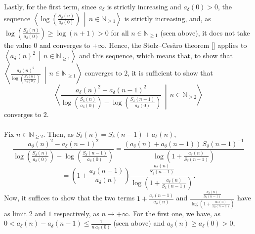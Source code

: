 \begin{solution}
    Lastly, for the first term, since \( a_\delta \) is strictly increasing and \( a_\delta\left(0\right) > 0 \), the sequence \( \left\langle \log\left(\frac{S_\delta\left(n\right)}{a_\delta\left(0\right)}\right) \,\middle|\, n \in \mathbb{N}_{\geq 1} \right\rangle \) is strictly increasing, and, as \( \log\left(\frac{S_\delta\left(n\right)}{a_\delta\left(0\right)}\right) \geq \log\left(n+1\right) > 0 \) for all \( n \in \mathbb{N}_{\geq 1} \) (seen above), it does not take the value \( 0 \) and converges to \( +\infty \). Hence, the Stolz–Ces\`aro theorem [] applies to \( \left\langle a_\delta\left(n\right)^2 \,\middle|\, n \in \mathbb{N}_{\geq 1} \right\rangle \) and this sequence, which means that, to show that \( \left\langle \frac{a_\delta\left(n\right)^2}{\log\left(\frac{S_\delta\left(n\right)}{a_\delta\left(0\right)}\right)} \,\middle|\, n \in \mathbb{N}_{\geq 1} \right\rangle \) converges to \( 2 \), it is sufficient to show that
    \[
        \left\langle \frac{a_\delta\left(n\right)^2-a_\delta\left(n-1\right)^2}{\log\left(\frac{S_\delta\left(n\right)}{a_\delta\left(0\right)}\right)-\log\left(\frac{S_\delta\left(n-1\right)}{a_\delta\left(0\right)}\right)} \,\middle|\, n \in \mathbb{N}_{\geq 2} \right\rangle
    \]
    converges to \( 2 \).
    \\\\
    Fix \( n \in \mathbb{N}_{\geq 2} \). Then, as \( S_\delta\left(n\right) = S_\delta\left(n-1\right)+a_\delta\left(n\right) \),
    \[
        \frac{a_\delta\left(n\right)^2-a_\delta\left(n-1\right)^2}{\log\left(\frac{S_\delta\left(n\right)}{a_\delta\left(0\right)}\right)-\log\left(\frac{S_\delta\left(n-1\right)}{a_\delta\left(0\right)}\right)} = \frac{\left(a_\delta\left(n\right)+a_\delta\left(n-1\right)\right)\,S_\delta\left(n-1\right)^{-1}}{\log\left(1+\frac{a_\delta\left(n\right)}{S_\delta\left(n-1\right)}\right)}
    \]
    \[
        = \left(1+\frac{a_\delta\left(n-1\right)}{a_\delta\left(n\right)}\right)\frac{\frac{a_\delta\left(n\right)}{S_\delta\left(n-1\right)}}{\log\left(1+\frac{a_\delta\left(n\right)}{S_\delta\left(n-1\right)}\right)}.
    \]
    Now, it suffices to show that the two terms \( 1+\frac{a_\delta\left(n-1\right)}{a_\delta\left(n\right)} \) and \( \frac{\frac{a_\delta\left(n\right)}{S_\delta\left(n-1\right)}}{\log\left(1+\frac{a_\delta\left(n\right)}{S_\delta\left(n-1\right)}\right)} \) have as limit \( 2 \) and \( 1 \) respectively, as \( n \to +\infty \). For the first one, we have, as \( 0 < a_\delta\left(n\right)-a_\delta\left(n-1\right) \leq \frac{1}{n\,a_\delta\left(0\right)} \) (seen above) and \( a_\delta\left(n\right) \geq a_\delta\left(0\right) > 0 \),

\end{solution}
